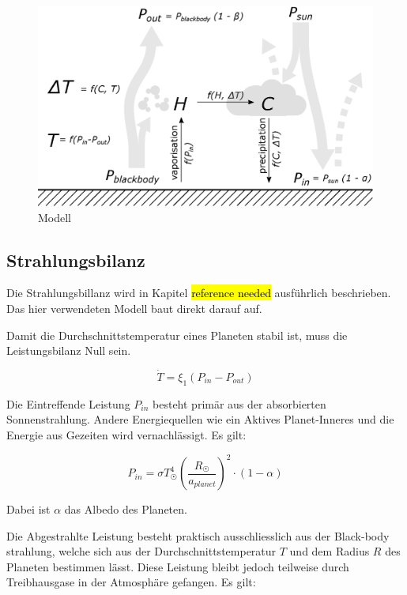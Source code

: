 \begin{refsection}
\begin{figure}
	\centering
	\includegraphics[width=\textwidth]{Pictures/Model.eps}
	\caption{Modell}
\end{figure}

\subsection{Strahlungsbilanz}

Die Strahlungsbillanz wird in Kapitel \hl{reference needed} ausführlich beschrieben. Das hier verwendeten Modell baut direkt darauf auf.

Damit die Durchschnittstemperatur eines Planeten stabil ist, muss die Leistungsbilanz Null sein.

\begin{equation}
\dot{T} = \xi_1(P_{in} - P_{out})
\end{equation}

Die Eintreffende Leistung $P_{in}$ besteht primär aus der absorbierten Sonnenstrahlung. Andere Energiequellen wie ein Aktives Planet-Inneres und die Energie aus Gezeiten wird vernachlässigt. Es gilt:

\begin{equation}
P_{in} = \sigma T_{\astrosun}^4 \left( \frac{R_{\astrosun}}{a_{planet}} \right) ^2 \cdot (1-\alpha)
\end{equation}

Dabei ist $\alpha$ das Albedo des Planeten.

Die Abgestrahlte Leistung besteht praktisch ausschliesslich aus der Black-body strahlung, welche sich aus der Durchschnittstemperatur $T$ und dem Radius $R$ des Planeten bestimmen lässt. Diese Leistung bleibt jedoch teilweise durch Treibhausgase in der Atmosphäre gefangen. Es gilt: 


\end{refsection}
